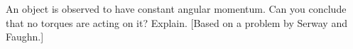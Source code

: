An object is observed to have constant angular momentum.
Can you conclude that no torques are acting on it? Explain. 
[Based on a problem by Serway and Faughn.]
